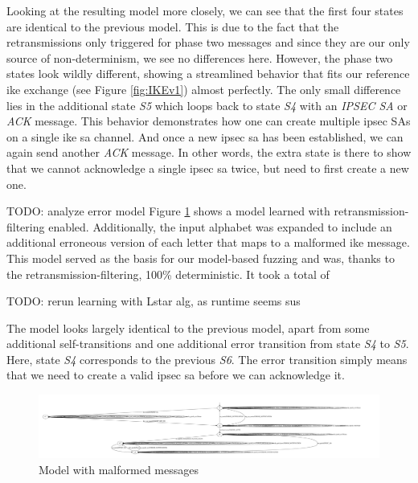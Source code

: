 Looking at the resulting model more closely, we can see that the first four states are identical to the previous model. This is due to the fact that the retransmissions only triggered for phase two messages and since they are our only source of non-determinism, we see no differences here. However, the phase two states look wildly different, showing a streamlined behavior that fits our reference \ac{ike} exchange (see Figure \ref{fig:IKEv1}) almost perfectly. The only small difference lies in the additional state \emph{S5} which loops back to state \emph{S4} with an \emph{IPSEC SA} or \emph{ACK} message. This behavior demonstrates how one can create multiple \ac{ipsec} SAs on a single \ac{ike} \ac{sa} channel. And once a new \ac{ipsec} \ac{sa} has been established, we can again send another \emph{ACK} message. In other words, the extra state is there to show that we cannot acknowledge a single \ac{ipsec} \ac{sa} twice, but need to first create a new one.

TODO: analyze error model
Figure \ref{fig:withfilterwitherrors} shows a model learned with retransmission-filtering enabled. Additionally, the input alphabet was expanded to include an additional erroneous version of each letter that maps to a malformed \ac{ike} message. This model served as the basis for our model-based fuzzing and was, thanks to the retransmission-filtering, 100\% deterministic. It took a total of 

TODO: rerun learning with Lstar alg, as runtime seems sus

The model looks largely identical to the previous model, apart from some additional self-transitions and one additional error transition from state \emph{S4} to \emph{S5}. Here, state \emph{S4} corresponds to the previous \emph{S6}. The error transition simply means that we need to create a valid \ac{ipsec} \ac{sa} before we can acknowledge it.

\begin{figure}
	\centering
	\includegraphics[width=\linewidth]{images/models/WithFilterWithErrors_kv}
	\caption{Model with malformed messages}
	\label{fig:withfilterwitherrors}
\end{figure}

